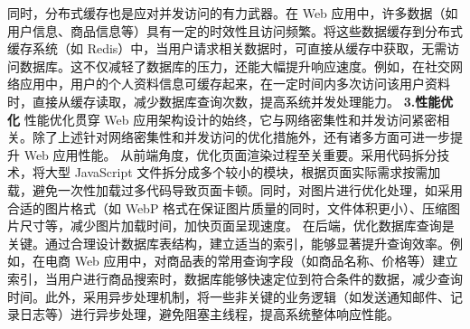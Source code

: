 同时，分布式缓存也是应对并发访问的有力武器。在 Web 应用中，许多数据（如用户信息、商品信息等）具有一定的时效性且访问频繁。将这些数据缓存到分布式缓存系统（如
Redis）中，当用户请求相关数据时，可直接从缓存中获取，无需访问数据库。这不仅减轻了数据库的压力，还能大幅提升响应速度。例如，在社交网络应用中，用户的个人资料信息可缓存起来，在一定时间内多次访问该用户资料时，直接从缓存读取，减少数据库查询次数，提高系统并发处理能力。
\textbf{3.性能优化} 性能优化贯穿 Web 应用架构设计的始终，它与网络密集性和并发访问紧密相关。除了上述针对网络密集性和并发访问的优化措施外，还有诸多方面可进一步提升 Web 应用性能。
从前端角度，优化页面渲染过程至关重要。采用代码拆分技术，将大型 JavaScript 文件拆分成多个较小的模块，根据页面实际需求按需加载，避免一次性加载过多代码导致页面卡顿。同时，对图片进行优化处理，如采用合适的图片格式（如 WebP
格式在保证图片质量的同时，文件体积更小）、压缩图片尺寸等，减少图片加载时间，加快页面呈现速度。 在后端，优化数据库查询是关键。通过合理设计数据库表结构，建立适当的索引，能够显著提升查询效率。例如，在电商 Web
应用中，对商品表的常用查询字段（如商品名称、价格等）建立索引，当用户进行商品搜索时，数据库能够快速定位到符合条件的数据，减少查询时间。此外，采用异步处理机制，将一些非关键的业务逻辑（如发送通知邮件、记录日志等）进行异步处理，避免阻塞主线程，提高系统整体响应性能。
